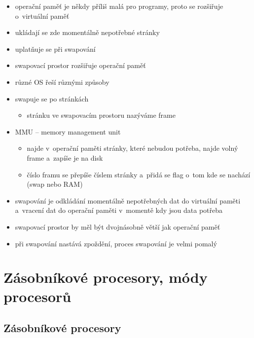 \documentclass[a4paper,12pt]{article}
\providecommand{\tightlist}{%
\setlength{\itemsep}{0pt}\setlength{\parskip}{0pt}}
\begin{document}
\begin{itemize}
\tightlist
\item operační paměť je někdy příliš malá pro programy, proto se rozšiřuje
o~virtuální paměť
\item ukládají se zde momentálně nepotřebné stránky
\item uplatňuje se při swapování
\item swapovací prostor rozšiřuje operační paměť
\item různé OS řeší různými způsoby
\item swapuje se po stránkách

  \begin{itemize}
  \tightlist
  \item stránku ve swapovacím prostoru nazýváme frame
  \end{itemize}
\item MMU -- memory management unit

  \begin{itemize}
  \tightlist
  \item najde v~operační paměti stránky, které nebudou potřeba, najde volný
    frame a~zapíše je na disk
  \item číslo framu se přepíše číslem stránky a~přidá se flag o~tom kde se
    nachází (swap nebo RAM)
  \end{itemize}
\item swapování je odkládání momentálně nepotřebných dat do virtuální paměti
  a~vracení dat do operační paměti v~momentě kdy jsou data potřeba
\item swapovací prostor by měl být dvojnásobně větší jak operační paměť
\item při swapování nastává zpoždění, proces swapování je velmi pomalý
\end{itemize}

\section{Zásobníkové procesory, módy procesorů}

\subsection{Zásobníkové procesory}
\end{document}
